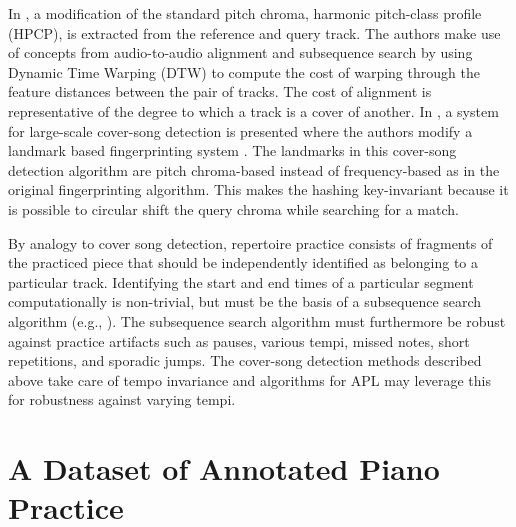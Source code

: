 \documentclass{article}
\begin{document}
In \cite{serra2008chroma}, a modification of the standard pitch chroma, harmonic pitch-class profile (HPCP), is extracted from the reference and query track. The authors make use of concepts from audio-to-audio alignment and subsequence search by using Dynamic Time Warping (DTW) to compute the cost of warping through the feature distances between the pair of tracks. The cost of alignment is representative of the degree to which a track is a cover of another.
%
In \cite{bertin2011large}, a system for large-scale cover-song detection is presented where the authors modify a landmark based fingerprinting system \cite{wang2003industrial}. The landmarks in this cover-song detection algorithm are pitch chroma-based instead of frequency-based as in the original fingerprinting algorithm. This makes the hashing key-invariant because it is possible to circular shift the query chroma while searching for a match.
%

By analogy to cover song detection, repertoire practice consists of fragments of the practiced piece that should be independently identified as belonging to a particular track. 
Identifying the start and end times of a particular segment computationally is non-trivial, but must be the basis of a subsequence search algorithm (e.g., \cite{GuoISMIR:2004}).  
The subsequence search algorithm must furthermore be robust against practice artifacts such as pauses, various tempi, missed notes, short repetitions, and sporadic jumps. The cover-song detection methods described above take care of tempo invariance and algorithms for APL may leverage this for robustness against varying tempi.

\section{A Dataset of Annotated Piano Practice}
\label{sec:Dataset}  

\end{document}
